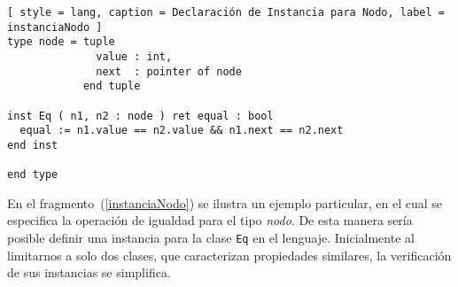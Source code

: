 \begin{lstlisting}[ style = lang, caption = Declaración de Instancia para Nodo, label = instanciaNodo ]
type node = tuple
              value : int,
              next  : pointer of node
            end tuple

inst Eq ( n1, n2 : node ) ret equal : bool
  equal := n1.value == n2.value && n1.next == n2.next
end inst

end type
\end{lstlisting}

En el fragmento~(\ref{instanciaNodo}) se ilustra un ejemplo particular, en el cual se especifica la operación de igualdad para el tipo \textit{nodo}.
De esta manera sería posible definir una instancia para la clase \lstinline[style = lang]{Eq} en el lenguaje.
Inicialmente al limitarnos a solo dos clases, que caracterizan propiedades similares, la verificación de sus instancias se simplifica.

\iffalse
A continuación, describimos informalmente las validaciones que se deberían efectuar para asegurar que una definición de instancia es correcta.

\begin{enumerate}
    \item Para todo tipo definido, existe una única instancia para una determinada clase.
    Similar a \Haskell{}, se pueden emplear tipos concretos, o agregar restricciones de clase a las variables de tipo, en las declaraciones de instancias para tipos parametrizados.
    \item Las instancias solo pueden tomar dos argumentos, y deben ser del mismo tipo.
    En particular, la definición del tipo y sus declaraciones de instancias deben ir juntas.
    Esta verificación es propia de las únicas dos clases del lenguaje.
    \item El retorno de una instancia debe ser un valor booleano.
    Esta propiedad, al igual que la anterior, es específica de las clases mencionadas previamente.
    \item El cuerpo de la declaración de instancias deberá cumplir las mismas verificaciones que satisface el cuerpo de una función.
    Esto se debería mantener incluso para las validaciones realizadas durante el tiempo de ejecución.
\end{enumerate}
\fi

\iffalse
Un último detalle importante a mencionar, es que la declaración de instancias se permite solamente para las estructuras de tipo tupla.
Esto es debido que un tipo enumerado satisface ambas clases de forma natural.
Mientras que un sinónimo de tipo, hereda todas las clases que implementa el tipo de su definición.
Si en un futuro se adoptará otro juicio, la modificación de la implementación actual es sencilla.
\fi

